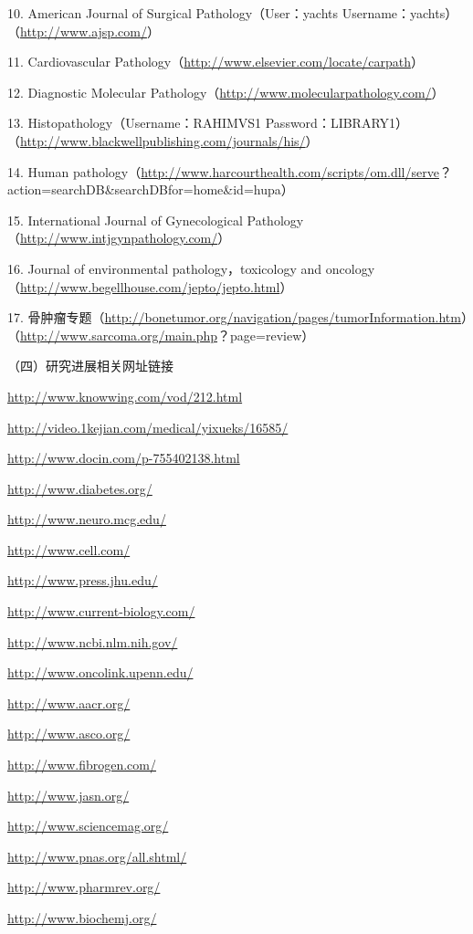 10. American Journal of Surgical Pathology（User：yachts
Username：yachts）（\url{http://www.ajsp.com/}）

11. Cardiovascular Pathology（\url{http://www.elsevier.com/locate/carpath}）

12. Diagnostic Molecular Pathology（\url{http://www.molecularpathology.com/}）

13. Histopathology（Username：RAHIMVS1
Password：LIBRARY1）（\url{http://www.blackwellpublishing.com/journals/his/}）

14. Human
pathology（\url{http://www.harcourthealth.com/scripts/om.dll/serve}？action=searchDB\&searchDBfor=home\&id=hupa）

15. International Journal of Gynecological
Pathology（\url{http://www.intjgynpathology.com/}）

16. Journal of environmental pathology，toxicology and
oncology（\url{http://www.begellhouse.com/jepto/jepto.html}）

17.
骨肿瘤专题（\url{http://bonetumor.org/navigation/pages/tumorInformation.htm}）（\url{http://www.sarcoma.org/main.php}？page=review）

（四）研究进展相关网址链接

\url{http://www.knowwing.com/vod/212.html}

\url{http://video.1kejian.com/medical/yixueks/16585/}

\url{http://www.docin.com/p-755402138.html}

\url{http://www.diabetes.org/}

\url{http://www.neuro.mcg.edu/}

\url{http://www.cell.com/}

\url{http://www.press.jhu.edu/}

\url{http://www.current-biology.com/}

\url{http://www.ncbi.nlm.nih.gov/}

\url{http://www.oncolink.upenn.edu/}

\url{http://www.aacr.org/}

\url{http://www.asco.org/}

\url{http://www.fibrogen.com/}

\url{http://www.jasn.org/}

\url{http://www.sciencemag.org/}

\url{http://www.pnas.org/all.shtml/}

\url{http://www.pharmrev.org/}

\url{http://www.biochemj.org/}

